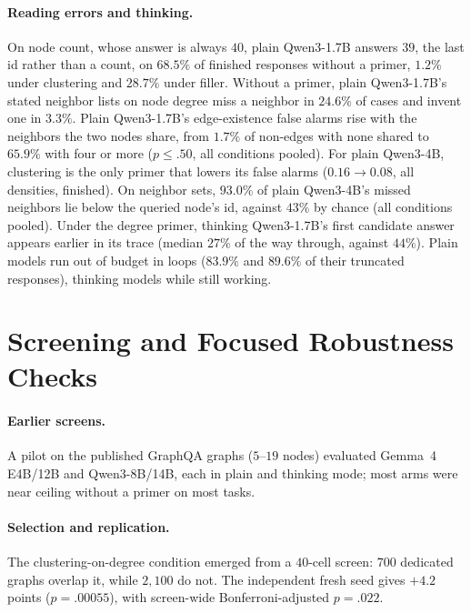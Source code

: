 \documentclass[11pt]{article}
\begin{document}
\paragraph{Reading errors and thinking.} On node count, whose answer is always $40$, plain Qwen3-1.7B answers $39$, the last id rather than a count, on $68.5\%$ of finished responses without a primer, $1.2\%$ under clustering and $28.7\%$ under filler. %
Without a primer, plain Qwen3-1.7B's stated neighbor lists on node degree miss a neighbor in $24.6\%$ of cases and invent one in $3.3\%$. %
Plain Qwen3-1.7B's edge-existence false alarms rise with the neighbors the two nodes share, from $1.7\%$ of non-edges with none shared to $65.9\%$ with four or more ($p\leq.50$, all conditions pooled). %
For plain Qwen3-4B, clustering is the only primer that lowers its false alarms ($0.16\to0.08$, all densities, finished). %
On neighbor sets, $93.0\%$ of plain Qwen3-4B's missed neighbors lie below the queried node's id, against $43\%$ by chance (all conditions pooled). %
Under the degree primer, thinking Qwen3-1.7B's first candidate answer appears earlier in its trace (median $27\%$ of the way through, against $44\%$). %
Plain models run out of budget in loops ($83.9\%$ and $89.6\%$ of their truncated responses), thinking models while still working. %


\section{Screening and Focused Robustness Checks}
\label{app:pilot}
\label{app:robust}

\paragraph{Earlier screens.} A pilot on the published GraphQA graphs ($5$--$19$ nodes) evaluated Gemma~4 E4B/12B and Qwen3-8B/14B, each in plain and thinking mode; most arms were near ceiling without a primer on most tasks.

\paragraph{Selection and replication.} The clustering-on-degree condition emerged from a $40$-cell screen: $700$ dedicated graphs overlap it, while $2{,}100$ do not. %
The independent fresh seed gives $+4.2$ points ($p=.00055$), with screen-wide Bonferroni-adjusted $p=.022$. %
\end{document}
